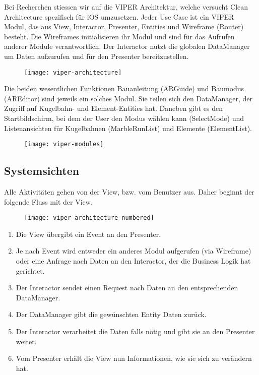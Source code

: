 Bei Recherchen stiessen wir auf die VIPER Architektur, welche versucht Clean Architecture spezifisch für iOS umzusetzen. Jeder Use Case ist ein VIPER Modul, das aus View, Interactor, Presenter, Entities und Wireframe (Router) besteht. Die Wireframes initialisieren ihr Modul und sind für das Aufrufen anderer Module verantwortlich. Der Interactor nutzt die globalen DataManager um Daten aufzurufen und für den Presenter bereitzustellen.

\begin{figure}
  \texttt{[image: viper-architecture]}
\end{figure}

Die beiden wesentlichen Funktionen Bauanleitung (ARGuide) und Baumodus (AREditor) sind jeweils ein solches Modul. Sie teilen sich den DataManager, der Zugriff auf Kugelbahn- und Element-Entities hat. Daneben gibt es den Startbildschirm, bei dem der User den Modus wählen kann (SelectMode) und Listenansichten für Kugelbahnen (MarbleRunList) und Elemente (ElementList).

\begin{figure}
  \texttt{[image: viper-modules]}
\end{figure}

\subsection{Systemsichten}

Alle Aktivitäten gehen von der View, bzw. vom Benutzer aus. Daher beginnt der folgende Fluss mit der View.

\begin{figure}
  \texttt{[image: viper-architecture-numbered]}
\end{figure}

\begin{enumerate}
  \item Die View übergibt ein Event an den Presenter.
  \item Je nach Event wird entweder ein anderes Modul aufgerufen (via Wireframe) oder eine Anfrage nach Daten an den Interactor, der die Business Logik hat gerichtet.
  \item Der Interactor sendet einen Request nach Daten an den entsprechenden DataManager.
  \item Der DataManager gibt die gewünschten Entity Daten zurück.
  \item Der Interactor verarbeitet die Daten falls nötig und gibt sie an den Presenter weiter.
  \item Vom Presenter erhält die View nun Informationen, wie sie sich zu verändern hat.
\end{enumerate}

